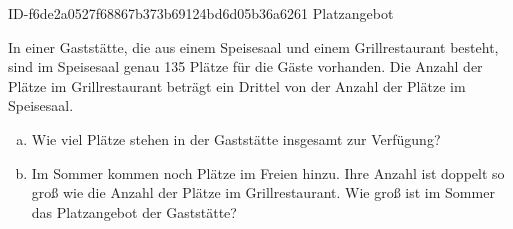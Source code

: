 \begin{exercise}
      {ID-f6de2a0527f68867b373b69124bd6d05b36a6261}
      {Platzangebot}
  \ifproblem\problem\par
    In einer Gaststätte, die aus einem Speisesaal und einem Grillrestaurant
    besteht, sind im Speisesaal genau 135 Plätze für die Gäste vorhanden.
    Die Anzahl der Plätze im Grillrestaurant beträgt ein Drittel von der
    Anzahl der Plätze im Speisesaal.
    \begin{enumerate}[a)]
      \item Wie viel Plätze stehen in der Gaststätte insgesamt zur Verfügung?
      \item Im Sommer kommen noch Plätze im Freien hinzu. Ihre Anzahl ist
            doppelt so groß wie die Anzahl der Plätze im Grillrestaurant.
            Wie groß ist im Sommer das Platzangebot der Gaststätte?
    \end{enumerate}
  \fi
\end{exercise}

